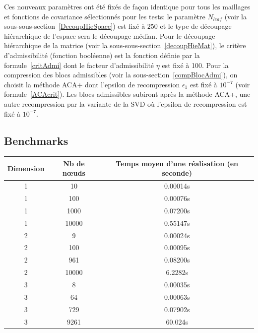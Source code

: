 Ces nouveaux paramètres ont été fixés de
façon identique pour tous les maillages et fonctions de covariance sélectionnés pour les tests: le paramètre $N_{leaf}$ (voir la sous-sous-section~\ref{DecoupHieSpace}) est fixé à $250$ et le type de découpage hiérarchique de l'espace sera le découpage médian. Pour le découpage
hiérarchique de la matrice (voir la sous-sous-section~\ref{decoupHieMat}), le critère
d'admissibilité (fonction booléenne) est la fonction définie par la formule~\eqref{critAdmi}
dont le facteur d'admissibilité $\eta$ est fixé à 100. Pour la compression des blocs
admissibles (voir la sous-section~\ref{compBlocAdmi}), on choisit la méthode ACA+
dont l'epsilon de recompression $\epsilon_1$ est fixé à $10^{-7}$ (voir formule~\eqref{ACAcrit}). Les blocs admissibles subiront après la méthode ACA+, une autre recompression par la
variante de la SVD où l'epsilon de recompression est fixé à $10^{-7}$.

\subsection{Benchmarks}

\begin{table}[htbp]
\centering
\begin{tabular}{|c |c |c |}
\hline
Dimension & Nb de n\oe uds & Temps moyen d'une réalisation (en seconde) \\
\hline
1 & 10 & 0.00014s    \\
\hline
1 & 100 & 0.00076s  \\
\hline
1 & 1000 & 0.07200s   \\
\hline
1 & 10000 & 0.55147s    \\
\hline
\hline
2 & 9 & 0.00024s    \\
\hline
2 & 100 & 0.00095s    \\
\hline
2 & 961 & 0.08200s  \\
\hline
2 & 10000 & 6.2282s   \\
\hline
\hline
3 & 8 & 0.00035s    \\
\hline
3 & 64 & 0.00063s    \\
\hline
3 & 729 & 0.07902s    \\
\hline
3 & 9261 & 60.024s  \\
\hline
\end{tabular}
\end{table}

